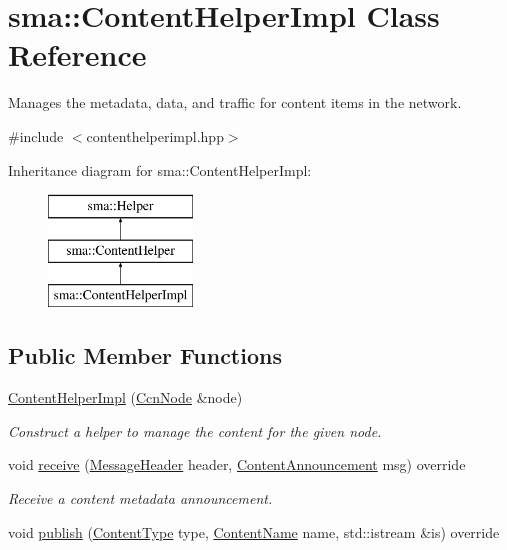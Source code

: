 \hypertarget{classsma_1_1ContentHelperImpl}{\section{sma\-:\-:Content\-Helper\-Impl Class Reference}
\label{classsma_1_1ContentHelperImpl}
}


Manages the metadata, data, and traffic for content items in the network.  




{\ttfamily \#include $<$contenthelperimpl.\-hpp$>$}

Inheritance diagram for sma\-:\-:Content\-Helper\-Impl\-:\begin{figure}[H]
\begin{center}
\leavevmode
\includegraphics[height=3.000000cm]{classsma_1_1ContentHelperImpl}
\end{center}
\end{figure}
\subsection*{Public Member Functions}
\begin{DoxyCompactItemize}
\item 
\hypertarget{classsma_1_1ContentHelperImpl_a6a563ca7776e4bfe685113726e20f35c}{\hyperlink{classsma_1_1ContentHelperImpl_a6a563ca7776e4bfe685113726e20f35c}{Content\-Helper\-Impl} (\hyperlink{classsma_1_1CcnNode}{Ccn\-Node} \&node)}\label{classsma_1_1ContentHelperImpl_a6a563ca7776e4bfe685113726e20f35c}

\begin{DoxyCompactList}\small\item\em Construct a helper to manage the content for the given node. \end{DoxyCompactList}\item 
void \hyperlink{classsma_1_1ContentHelperImpl_a0e4d3852c2c723e9e07242fa74738c63}{receive} (\hyperlink{structsma_1_1MessageHeader}{Message\-Header} header, \hyperlink{structsma_1_1ContentAnnouncement}{Content\-Announcement} msg) override
\begin{DoxyCompactList}\small\item\em Receive a content metadata announcement. \end{DoxyCompactList}\item 
void \hyperlink{classsma_1_1ContentHelperImpl_a42163a01426a03d4517c245904aafbb3}{publish} (\hyperlink{structsma_1_1ContentType}{Content\-Type} type, \hyperlink{structsma_1_1ContentName}{Content\-Name} name, std\-::istream \&is) override
\end{DoxyCompactItemize}
